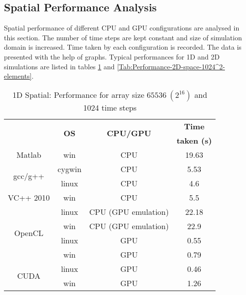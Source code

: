 \subsection{Spatial Performance Analysis}
Spatial performance of different CPU and GPU configurations are analysed in this section. The number of time steps are kept constant and size of simulation domain is increased. Time taken by each configuration is recorded. The data is presented with the help of graphs. Typical performances for 1D and 2D simulations are listed in tables \ref{Tab:Performance-1D-space-65536-elements} and \ref{Tab:Performance-2D-space-1024^2-elements}.
\begin{table}[H]
\begin{center}
\vspace{0.3cm}
	\begin{tabular}{cccc}
	\hline \hline
		\rule{0pt}{2.6ex} \multirow{2}{*}{\textbf{API}} & \multirow{2}{*}{\textbf{OS}} & \multirow{2}{*}{\textbf{CPU/GPU}}  & \textbf{Time}\\
		& &  & \textbf{taken (s)}\\
		\hline
		Matlab \rule{0pt}{2.6ex} & win & CPU &19.63\\
		\hline
		\multirow{2}{*}{gcc/g++} \rule{0pt}{2.6ex} & cygwin & CPU &5.53\\
		& linux & CPU &4.6\\
		\hline
		VC++ 2010 \rule{0pt}{2.6ex} & win & CPU &5.5\\
		\hline
		\multirow{4}{*}{OpenCL} \rule{0pt}{2.6ex} & linux & CPU (GPU emulation) &22.18\\
		& win & CPU (GPU emulation) &22.9\\
		& linux & GPU &0.55\\
		& win & GPU &0.79\\
		\hline
		\multirow{2}{*}{CUDA} \rule{0pt}{2.6ex} & linux & GPU &0.46\\
		& win & GPU &1.26\\
	\hline \hline
	\end{tabular}
\end{center}
\caption{1D Spatial: Performance for array size $65536~(2^{16})$ and 1024 time steps}
\label{Tab:Performance-1D-space-65536-elements}
\end{table}

